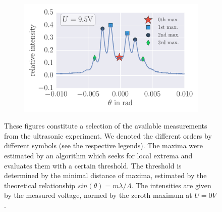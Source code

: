 \begin{figure}[H]
\begin{subfigure}[b]{\picwidth}
        \caption{}
        \label{fig:raman_014}
    \end{subfigure}
    \begin{subfigure}[b]{\picwidth}
        \includegraphics[width=1.0\textwidth]{analysis/figures/raman_020}
        \caption{}
        \label{fig:raman_020}
    \end{subfigure}
    \caption{
        These figures constitute a selection of the available measurements 
        from the ultrasonic experiment. We denoted the 
        different orders by different symbols (see the respective legends). 
        The maxima were estimated by an algorithm which seeks for local extrema
        and evaluates them with a certain threshold. The threshold is determined 
        by the minimal distance of maxima, estimated by the theoretical 
        relationship $sin(\theta) = m \lambda / \Lambda$. 
        The intensities are given by the measured voltage,
        normed by the zeroth maximum at $U=0V$.
        }
    \label{fig:ultrasonic1}
\end{figure}
\newpage
